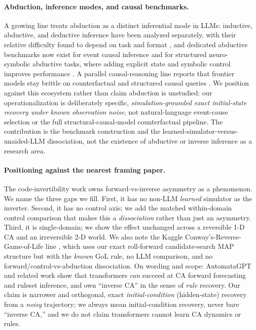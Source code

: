 \documentclass{article}
\begin{document}
\paragraph{Abduction, inference modes, and causal benchmarks.}
A growing line treats abduction as a distinct inferential mode in LLMs: inductive, abductive, and
deductive inference have been analyzed separately, with their relative difficulty found to depend on
task and format \cite{logidynamics}, and dedicated abductive benchmarks now exist for event causal
inference \cite{semeval2026aer} and for structured neuro-symbolic abductive tasks, where adding
explicit state and symbolic control improves performance \cite{graphofstates}. A parallel
causal-reasoning line reports that frontier models stay brittle on counterfactual and structured
causal queries \cite{cladder, counterbench}. We position against this ecosystem rather than claim
abduction is unstudied: our operationalization is deliberately specific, \emph{simulation-grounded
exact initial-state recovery under known observation noise}, not natural-language event-cause
selection or the full structural-causal-model counterfactual pipeline. The contribution is the
benchmark construction and the learned-simulator-versus-unaided-LLM dissociation, not the existence of
abductive or inverse inference as a research area.

\paragraph{Positioning against the nearest framing paper.}
The code-invertibility work \cite{codeinvert} owns forward-vs-inverse asymmetry as a phenomenon. We
name the three gaps we fill. First, it has no non-LLM \emph{learned} simulator as the inverter.
Second, it has no control axis; we add the matched within-domain control comparison that makes this a
\emph{dissociation} rather than just an asymmetry. Third, it is single-domain; we show the effect
unchanged across a reversible 1-D CA and an irreversible 2-D world. We also note the Kaggle
Conway's-Reverse-Game-of-Life line \cite{conwayreverse}, which uses our exact roll-forward
candidate-search MAP structure but with the \emph{known} GoL rule, no LLM comparison, and no
forward/control-vs-abduction dissociation. On wording and scope: AutomataGPT and related work \cite{automatagpt} show that transformers
\emph{can} succeed at CA forward forecasting and ruleset inference, and own ``inverse CA'' in the
sense of \emph{rule} recovery. Our claim is narrower and orthogonal, exact \emph{initial-condition}
(hidden-state) recovery from a \emph{noisy} trajectory; we always mean initial-condition recovery,
never bare ``inverse CA,'' and we do not claim transformers cannot learn CA dynamics or rules.
\end{document}
